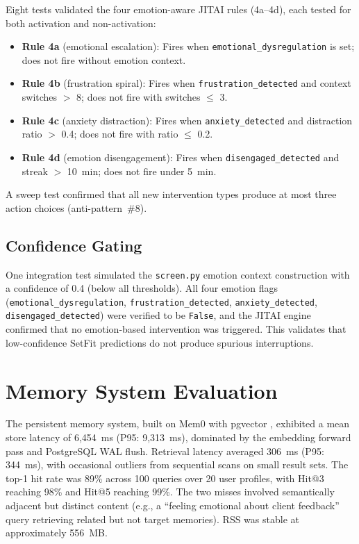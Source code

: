 Eight tests validated the four emotion-aware JITAI rules (4a--4d), each tested for both activation and non-activation:

\begin{itemize}[nosep]
  \item \textbf{Rule 4a} (emotional escalation): Fires when \texttt{emotional\_dysregulation} is set; does not fire without emotion context.
  \item \textbf{Rule 4b} (frustration spiral): Fires when \texttt{frustration\_detected} and context switches $>$ 8; does not fire with switches $\leq$ 3.
  \item \textbf{Rule 4c} (anxiety distraction): Fires when \texttt{anxiety\_detected} and distraction ratio $>$ 0.4; does not fire with ratio $\leq$ 0.2.
  \item \textbf{Rule 4d} (emotion disengagement): Fires when \texttt{disengaged\_detected} and streak $>$ 10~min; does not fire under 5~min.
\end{itemize}

A sweep test confirmed that all new intervention types produce at most three action choices (anti-pattern~\#8).

\subsection{Confidence Gating}
\label{subsec:confidence-gating-tests}

One integration test simulated the \texttt{screen.py} emotion context construction with a confidence of 0.4 (below all thresholds). All four emotion flags (\texttt{emotional\_dysregulation}, \texttt{frustration\_detected}, \texttt{anxiety\_detected}, \texttt{disengaged\_detected}) were verified to be \texttt{False}, and the JITAI engine confirmed that no emotion-based intervention was triggered. This validates that low-confidence SetFit predictions do not produce spurious interruptions.

\section{Memory System Evaluation}
\label{sec:memory-evaluation}

The persistent memory system, built on Mem0 with pgvector \cite{chhikara2025}, exhibited a mean store latency of 6,454~ms (P95: 9,313~ms), dominated by the embedding forward pass and PostgreSQL WAL flush. Retrieval latency averaged 306~ms (P95: 344~ms), with occasional outliers from sequential scans on small result sets. The top-1 hit rate was 89\% across 100 queries over 20 user profiles, with Hit@3 reaching 98\% and Hit@5 reaching 99\%. The two misses involved semantically adjacent but distinct content (e.g., a ``feeling emotional about client feedback'' query retrieving related but not target memories). RSS was stable at approximately 556~MB.

